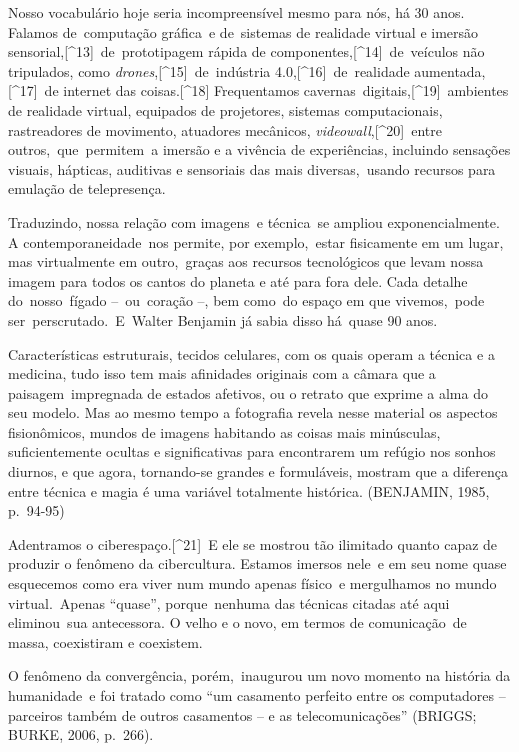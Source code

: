 \documentclass[
  letterpaper,
  a4paper,
  12pt]{scrbook}
\renewenvironment{quote}
  {\par\singlespacing\small\list{}{\rightmargin=0cm \leftmargin=4cm}%
   \item\relax}
  {\endlist}
\begin{document}
Nosso vocabulário hoje seria incompreensível mesmo para nós, há 30 anos.
Falamos de~computação gráfica~e de~sistemas de realidade virtual e
imersão sensorial,{[}\^{}13{]}~de~prototipagem rápida de
componentes,{[}\^{}14{]}~de~veículos não tripulados, como
\emph{drones},{[}\^{}15{]}~de~indústria 4.0,{[}\^{}16{]}~de~realidade
aumentada,{[}\^{}17{]}~de internet das coisas.{[}\^{}18{]} Frequentamos
cavernas~digitais,{[}\^{}19{]}~ambientes de realidade virtual, equipados
de projetores, sistemas computacionais, rastreadores de movimento,
atuadores mecânicos, \emph{videowall},{[}\^{}20{]}~entre
outros,~que~permitem~a imersão e a vivência de experiências, incluindo
sensações visuais, hápticas, auditivas e sensoriais das mais
diversas,~usando recursos para emulação de telepresença.

Traduzindo, nossa relação com imagens~e técnica~se ampliou
exponencialmente. A contemporaneidade~nos permite, por exemplo,~estar
fisicamente em um lugar, mas virtualmente em outro,~graças aos recursos
tecnológicos que levam nossa imagem para todos os cantos do planeta e
até para fora dele. Cada detalhe do~nosso~fígado --~ou~coração --, bem
como~do espaço em que vivemos,~pode ser~perscrutado.~E~Walter Benjamin
já sabia disso há~quase 90 anos.~ ~

\begin{quote}
Características estruturais, tecidos celulares, com os quais operam a
técnica e a medicina, tudo isso tem mais afinidades originais com a
câmara que a paisagem~impregnada de estados afetivos, ou o retrato que
exprime a alma do seu modelo. Mas ao mesmo tempo a fotografia revela
nesse material os aspectos fisionômicos, mundos de imagens habitando as
coisas mais minúsculas, suficientemente ocultas e significativas para
encontrarem um refúgio nos sonhos diurnos, e que agora, tornando-se
grandes e formuláveis, mostram que a diferença entre técnica e magia é
uma variável totalmente histórica. (BENJAMIN, 1985, p.~94-95)~ ~
\end{quote}

Adentramos o ciberespaço.{[}\^{}21{]}~E ele se mostrou tão ilimitado
quanto capaz de produzir o fenômeno da cibercultura. Estamos imersos
nele~e em seu nome quase esquecemos como era viver num mundo apenas
físico~e mergulhamos no mundo virtual.~Apenas ``quase'', porque~nenhuma
das técnicas citadas até aqui eliminou~sua antecessora. O velho e o
novo, em termos de comunicação~de massa, coexistiram e coexistem.

O fenômeno da convergência, porém,~inaugurou um novo momento na história
da humanidade~e foi tratado como ``um casamento perfeito entre os
computadores -- parceiros também de outros casamentos -- e as
telecomunicações'' (BRIGGS; BURKE, 2006, p.~266).~
\end{document}
